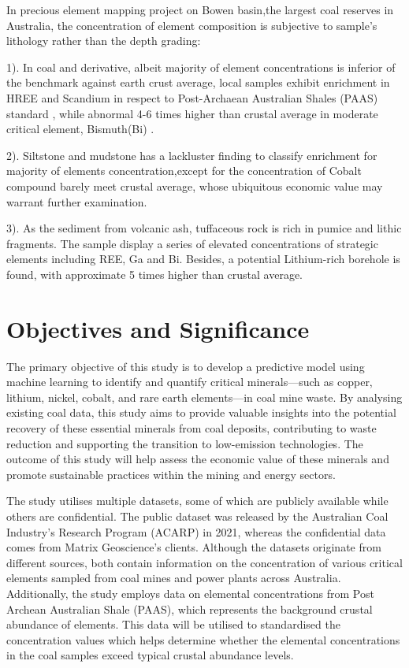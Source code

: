 \documentclass[11pt,a4paper,]{article}
\begin{document}
In precious \textcite{Hodgkinson2020} element mapping project on Bowen basin,the largest coal reserves in Australia, the concentration of element composition is subjective to sample's lithology rather than the depth grading:

1). In coal and derivative, albeit majority of element concentrations is inferior of the benchmark against earth crust average, local samples exhibit enrichment in HREE and Scandium in respect to \textcite{McLennan2011} Post-Archaean Australian Shales (PAAS) standard , while abnormal 4-6 times higher than crustal average in moderate critical element, Bismuth(Bi) .

2). Siltstone and mudstone has a lackluster finding to classify enrichment for majority of elements concentration,except for the concentration of Cobalt compound barely meet crustal average, whose ubiquitous economic value may warrant further examination.

3). As the sediment from volcanic ash, tuffaceous rock is rich in pumice and lithic fragments. The sample display a series of elevated concentrations of strategic elements including REE, Ga and Bi. Besides, a potential Lithium-rich borehole is found, with approximate 5 times higher than crustal average.

\section{Objectives and Significance}\label{objectives-and-significance}

The primary objective of this study is to develop a predictive model using machine learning to identify and quantify critical minerals---such as copper, lithium, nickel, cobalt, and rare earth elements---in coal mine waste. By analysing existing coal data, this study aims to provide valuable insights into the potential recovery of these essential minerals from coal deposits, contributing to waste reduction and supporting the transition to low-emission technologies. The outcome of this study will help assess the economic value of these minerals and promote sustainable practices within the mining and energy sectors.

The study utilises multiple datasets, some of which are publicly available while others are confidential. The public dataset was released by the Australian Coal Industry's Research Program (ACARP) in 2021, whereas the confidential data comes from Matrix Geoscience's clients. Although the datasets originate from different sources, both contain information on the concentration of various critical elements sampled from coal mines and power plants across Australia. Additionally, the study employs data on elemental concentrations from Post Archean Australian Shale (PAAS), which represents the background crustal abundance of elements. This data will be utilised to standardised the concentration values which helps determine whether the elemental concentrations in the coal samples exceed typical crustal abundance levels.
\end{document}
